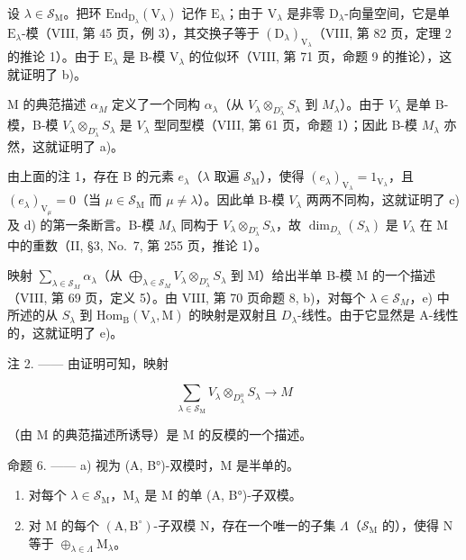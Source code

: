 设 \(\lambda \in \mathcal{S}_{\mathrm{M}}\)。把环 \(\mathrm{End}_{\mathrm{D}_{\lambda}}(\mathrm{V}_{\lambda})\) 记作 \(\mathrm{E}_{\lambda}\)；由于 \(\mathrm{V}_{\lambda}\) 是非零 \(\mathrm{D}_{\lambda}\)-向量空间，它是单 \(\mathrm{E}_{\lambda}\)-模（VIII, 第 45 页，例 3），其交换子等于 \((\mathrm{D}_{\lambda})_{\mathrm{V}_{\lambda}}\)（VIII, 第 82 页，定理 2 的推论 1）。由于 \(\mathrm{E}_{\lambda}\) 是 B-模 \(\mathrm{V}_{\lambda}\) 的位似环（VIII, 第 71 页，命题 9 的推论），这就证明了 b)。

M 的典范描述 \(\alpha_{M}\) 定义了一个同构 \(\alpha_{\lambda}\)（从 \(V_{\lambda}\otimes_{D_{\lambda}^{\circ}}S_{\lambda}\) 到 \(M_{\lambda}\)）。由于 \(V_{\lambda}\) 是单 B-模，B-模 \(V_{\lambda}\otimes_{D_{\lambda}^{\circ}}S_{\lambda}\) 是 \(V_{\lambda}\) 型同型模（VIII, 第 61 页，命题 1）；因此 B-模 \(M_{\lambda}\) 亦然，这就证明了 a)。

由上面的注 1，存在 B 的元素 \(e_{\lambda}\)（\(\lambda\) 取遍 \(\mathcal{S}_{\mathrm{M}}\)），使得 \((e_{\lambda})_{\mathrm{V}_{\lambda}} = 1_{\mathrm{V}_{\lambda}}\)，且 \((e_{\lambda})_{\mathrm{V}_{\mu}} = 0\)（当 \(\mu \in \mathcal{S}_{\mathrm{M}}\) 而 \(\mu \neq \lambda\)）。因此单 B-模 \(V_{\lambda}\) 两两不同构，这就证明了 c) 及 d) 的第一条断言。B-模 \(M_{\lambda}\) 同构于 \(V_{\lambda} \otimes_{D_{\lambda}^{\circ}} S_{\lambda}\)，故 \(\dim_{D_{\lambda}}(S_{\lambda})\) 是 \(V_{\lambda}\) 在 M 中的重数（II, §3, No.~7, 第 255 页，推论 1）。

映射 \(\sum_{\lambda\in\mathcal{S}_{M}}\alpha_{\lambda}\)（从 \(\bigoplus_{\lambda\in\mathcal{S}_{M}}V_{\lambda}\otimes_{D_{\lambda}^{\circ}}S_{\lambda}\) 到 M）给出半单 B-模 M 的一个描述（VIII, 第 69 页，定义 5）。由 VIII, 第 70 页命题 8, b)，对每个 \(\lambda\in\mathcal{S}_{M}\)，e) 中所述的从 \(S_{\lambda}\) 到 \(\mathrm{Hom}_{\mathrm{B}}(\mathrm{V}_{\lambda},\mathrm{M})\) 的映射是双射且 \(D_{\lambda}\)-线性。由于它显然是 A-线性的，这就证明了 e)。

注 2. —— 由证明可知，映射

\[
\sum_ {\lambda \in \mathcal {S} _ {\mathrm{M}}} V _ {\lambda} \otimes_ {D _ {\lambda} ^ {\mathrm{o}}} S _ {\lambda} \longrightarrow M
\]

（由 M 的典范描述所诱导）是 M 的反模的一个描述。

命题 6. —— a) 视为 (A, B°)-双模时，M 是半单的。

\begin{enumerate}
\def\labelenumi{\alph{enumi})}
\setcounter{enumi}{1}
\item
  对每个 \(\lambda \in \mathcal{S}_{\mathrm{M}}\)，\(\mathrm{M}_{\lambda}\) 是 M 的单 (A, B°)-子双模。
\item
  对 M 的每个 \((\mathrm{A},\mathrm{B}^{\circ})\)-子双模 N，存在一个唯一的子集 \(\Lambda\)（\(\mathcal{S}_{\mathrm{M}}\) 的），使得 N 等于 \(\oplus_{\lambda \in \Lambda}\mathrm{M}_{\lambda}\)。
\end{enumerate}


